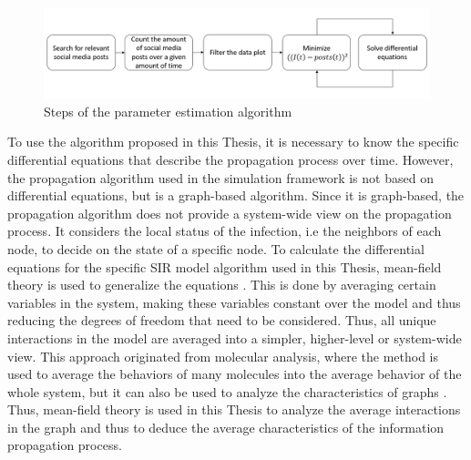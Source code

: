 \begin{figure}[!ht]
    \center
    \includegraphics[scale=.65]{figs/parameter_estimation_process.png}
    \caption{Steps of the parameter estimation algorithm}
    \label{paramestimationbasic}
\end{figure}

To use the algorithm proposed in this Thesis, it is necessary to 
know the specific differential equations that describe the propagation 
process over time. However, the propagation algorithm
used in the simulation framework is not based on differential equations,
but is a graph-based algorithm. Since it is graph-based, the propagation algorithm
does not provide a system-wide view on the propagation process.
It considers the local status of the infection, i.e the neighbors
of each node, to decide on the state of a specific node.
To calculate the differential equations for the specific SIR model algorithm
used in this Thesis, mean-field theory is used to generalize the equations
\cite{chaikin1995principles}.
This is done by averaging certain variables in the system, making these
variables constant over the model and thus 
reducing the degrees of freedom that need to be considered.
Thus, all unique interactions in the model are averaged into a simpler,
higher-level or system-wide view.
This approach originated from molecular analysis, where the method is used
to average the behaviors of many molecules into the average behavior
of the whole system,
but it can also be used to analyze the characteristics of graphs
\cite{barabasi1999mean}\cite{sirsmodel}.
Thus, mean-field theory is used in this Thesis to 
analyze the average interactions in the graph and thus to deduce 
the average characteristics of the information 
propagation process. 

